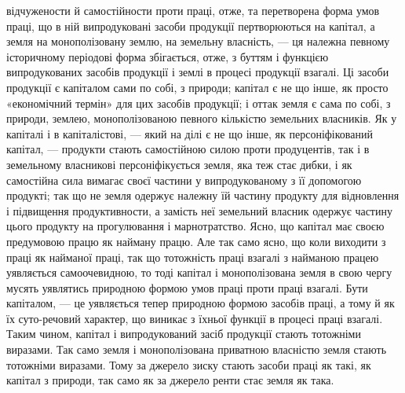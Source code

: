 \parcont{}  %
відчужености й самостійности проти праці, отже, та перетворена форма умов
праці, що в ній випродуковані засоби продукції пертворюються на капітал, а
земля на монополізовану землю, на земельну власність, — ця належна певному
історичному періодові форма збігається, отже, з буттям і функцією випродукованих
засобів продукції і землі в процесі продукції взагалі. Ці засоби продукції
є капіталом сами по собі, з природи; капітал є не що інше, як просто «економічний
термін» для цих засобів продукції; і оттак земля є сама по собі, з
природи, землею, монополізованою певного кількістю земельних власників. Як
у капіталі і в капіталістові, — який на ділі є не що інше, як персоніфікований
капітал, — продукти стають самостійною силою проти продуцентів, так і в земельному
власникові персоніфікується земля, яка теж стає дибки, і як самостійна
сила вимагає своєї частини у випродукованому з її допомогою продукті;
так що не земля одержує належну їй частину продукту для відновлення
і підвищення продуктивности, а замість неї земельний власник одержує частину
цього продукту на прогулювання і марнотратство. Ясно, що капітал має
своєю предумовою працю як найману працю. Але так само ясно, що коли виходити
з праці як найманої праці, так що тотожність праці взагалі з найманою
працею уявляється самоочевидною, то тоді капітал і монополізована земля
в свою чергу мусять уявлятись природною формою умов праці проти праці
взагалі. Бути капіталом, — це уявляється тепер природною формою засобів праці,
а тому й як їх суто-речовий характер, що виникає з їхньої функції
в процесі праці взагалі. Таким чином, капітал і випродукований засіб продукції
стають тотожніми виразами. Так само земля і монополізована приватною власністю
земля стають тотожніми виразами. Тому за джерело зиску стають засоби
праці як такі, як капітал з природи, так само як за джерело ренти стає земля
як така.

